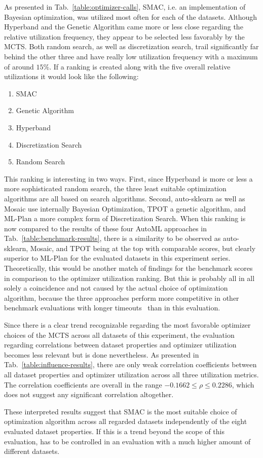 As presented in Tab.~\ref{table:optimizer-calls}, SMAC, i.e. an implementation of Bayesian optimization, was utilized most often for each of the datasets.
Although Hyperband and the Genetic Algorithm came more or less close regarding the relative utilization frequency, they appear to be selected less favorably by the MCTS.
Both random search, as well as discretization search, trail significantly far behind the other three and have really low utilization frequency with a maximum of around $15\%$.\newline
If a ranking is created along with the five overall relative utilizations it would look like the following:
\begin{enumerate}
    \item SMAC
    \item Genetic Algorithm
    \item Hyperband
    \item Discretization Search
    \item Random Search
\end{enumerate}
This ranking is interesting in two ways.
First, since Hyperband is more or less a more sophisticated random search, the three least suitable optimization algorithms are all based on search algorithms.\newline
Second, auto-sklearn as well as Mosaic use internally Bayesian Optimization, TPOT a genetic algorithm, and ML-Plan a more complex form of Discretization Search.
When this ranking is now compared to the results of these four AutoML approaches in Tab.~\ref{table:benchmark-results}, there is a similarity to be observed as auto-sklearn, Mosaic, and TPOT being at the top with comparable scores, but clearly superior to ML-Plan for the evaluated datasets in this experiment series.
Theoretically, this would be another match of findings for the benchmark scores in comparison to the optimizer utilization ranking.
But this is probably all in all solely a coincidence and not caused by the actual choice of optimization algorithm, because the three approaches perform more competitive in other benchmark evaluations with longer timeouts~\cite{Mohr-ML-Plan} than in this evaluation.

Since there is a clear trend recognizable regarding the most favorable optimizer choices of the MCTS across all datasets of this experiment, the evaluation regarding correlations between dataset properties and optimizer utilization becomes less relevant but is done nevertheless.\newline
As presented in Tab.~\ref{table:influence-results}, there are only weak correlation coefficients between all dataset properties and optimizer utilization across all three utilization metrics.
The correlation coefficients are overall in the range $-0.1662 \leq \rho \leq 0.2286$, which does not suggest any significant correlation altogether.

These interpreted results suggest that SMAC is the most suitable choice of optimization algorithm across all regarded datasets independently of the eight evaluated dataset properties.
If this is a trend beyond the scope of this evaluation, has to be controlled in an evaluation with a much higher amount of different datasets.
